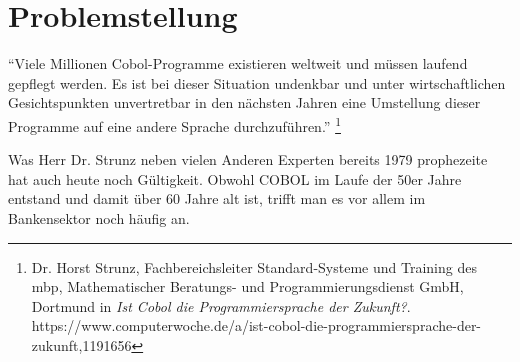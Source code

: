 \section{Problemstellung}

``Viele Millionen Cobol-Programme existieren weltweit und müssen laufend gepflegt werden.
Es ist bei dieser Situation undenkbar und unter wirtschaftlichen Gesichtspunkten unvertretbar in den nächsten Jahren eine Umstellung dieser Programme auf eine andere Sprache durchzuführen.'' \footnote{Dr. Horst Strunz, Fachbereichsleiter Standard-Systeme und Training des mbp, Mathematischer Beratungs- und Programmierungsdienst GmbH, Dortmund in \textit{Ist Cobol die Programmiersprache der Zukunft?}. \\ https://www.computerwoche.de/a/ist-cobol-die-programmiersprache-der-zukunft,1191656}

Was Herr Dr. Strunz neben vielen Anderen Experten bereits 1979 prophezeite hat auch heute noch Gültigkeit. Obwohl COBOL im Laufe der 50er Jahre entstand und damit über 60 Jahre alt ist, trifft man es vor allem im Bankensektor noch häufig an. 
\\

